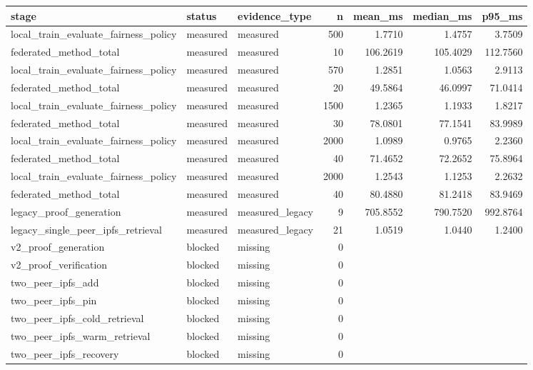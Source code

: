 \begin{tabular}{lllrrrr}
\toprule
stage & status & evidence\_type & n & mean\_ms & median\_ms & p95\_ms \\
\midrule
local\_train\_evaluate\_fairness\_policy & measured & measured & 500 & 1.7710 & 1.4757 & 3.7509 \\
federated\_method\_total & measured & measured & 10 & 106.2619 & 105.4029 & 112.7560 \\
local\_train\_evaluate\_fairness\_policy & measured & measured & 570 & 1.2851 & 1.0563 & 2.9113 \\
federated\_method\_total & measured & measured & 20 & 49.5864 & 46.0997 & 71.0414 \\
local\_train\_evaluate\_fairness\_policy & measured & measured & 1500 & 1.2365 & 1.1933 & 1.8217 \\
federated\_method\_total & measured & measured & 30 & 78.0801 & 77.1541 & 83.9989 \\
local\_train\_evaluate\_fairness\_policy & measured & measured & 2000 & 1.0989 & 0.9765 & 2.2360 \\
federated\_method\_total & measured & measured & 40 & 71.4652 & 72.2652 & 75.8964 \\
local\_train\_evaluate\_fairness\_policy & measured & measured & 2000 & 1.2543 & 1.1253 & 2.2632 \\
federated\_method\_total & measured & measured & 40 & 80.4880 & 81.2418 & 83.9469 \\
legacy\_proof\_generation & measured & measured\_legacy & 9 & 705.8552 & 790.7520 & 992.8764 \\
legacy\_single\_peer\_ipfs\_retrieval & measured & measured\_legacy & 21 & 1.0519 & 1.0440 & 1.2400 \\
v2\_proof\_generation & blocked & missing & 0 &  &  &  \\
v2\_proof\_verification & blocked & missing & 0 &  &  &  \\
two\_peer\_ipfs\_add & blocked & missing & 0 &  &  &  \\
two\_peer\_ipfs\_pin & blocked & missing & 0 &  &  &  \\
two\_peer\_ipfs\_cold\_retrieval & blocked & missing & 0 &  &  &  \\
two\_peer\_ipfs\_warm\_retrieval & blocked & missing & 0 &  &  &  \\
two\_peer\_ipfs\_recovery & blocked & missing & 0 &  &  &  \\
\bottomrule
\end{tabular}
